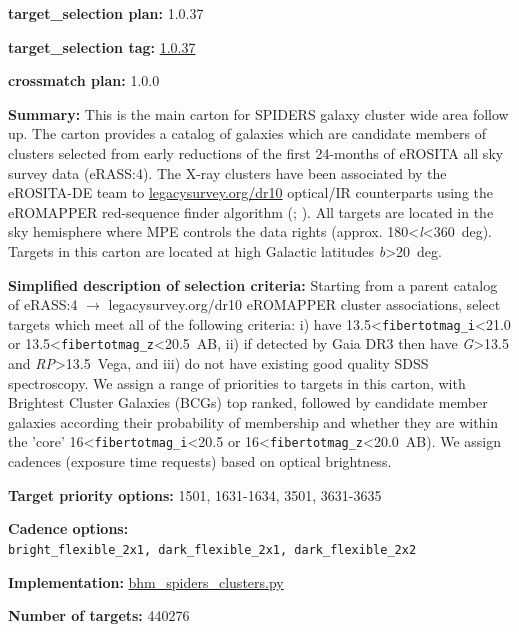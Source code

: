 \noindent\textbf{target\_selection plan:} 1.0.37

\noindent\textbf{target\_selection tag:}
\href{https://github.com/sdss/target_selection/tree/1.0.37/}{1.0.37}

\noindent\textbf{crossmatch plan:} 1.0.0

\noindent\textbf{Summary:} This is the main carton for SPIDERS galaxy cluster
wide area follow up. The carton provides a catalog of galaxies which are
candidate members of clusters selected from early reductions of the
first 24-months of eROSITA all sky survey data (eRASS:4). The X-ray
clusters have been associated by the eROSITA-DE team to
\href{https://www.legacysurvey.org/dr10/}{legacysurvey.org/dr10}
optical/IR counterparts using the eROMAPPER red-sequence finder
algorithm
(\citealt{Rykoff2014};
\citealt{IderChitham2020}). All targets are located in the sky hemisphere
where MPE controls the data rights (approx.
180\textless{}\emph{l}\textless360~deg). Targets in this carton are
located at high Galactic latitudes
\textbar{}\emph{b}\textbar\textgreater20~deg.

\noindent\textbf{Simplified description of selection criteria:} Starting from a
parent catalog of eRASS:4 $\rightarrow$ legacysurvey.org/dr10 eROMAPPER cluster
associations, select targets which meet all of the following criteria:
i) have 13.5\textless{}\texttt{fibertotmag\_i}\textless21.0 or
13.5\textless{}\texttt{fibertotmag\_z}\textless20.5~AB, ii) if detected
by Gaia DR3 then have \emph{G}\textgreater13.5 and
\emph{RP}\textgreater13.5~Vega, and iii) do not have existing good
quality SDSS spectroscopy. We assign a range of priorities to targets in
this carton, with Brightest Cluster Galaxies (BCGs) top ranked, followed
by candidate member galaxies according their probability of membership
and whether they are within the 'core'
16\textless{}\texttt{fibertotmag\_i}\textless20.5 or
16\textless{}\texttt{fibertotmag\_z}\textless20.0~AB). We assign
cadences (exposure time requests) based on optical brightness.


\noindent\textbf{Target priority options:} 1501, 1631-1634, 3501, 3631-3635

\noindent\textbf{Cadence options:}
\texttt{bright\_flexible\_2x1,\ dark\_flexible\_2x1,\ dark\_flexible\_2x2}

\noindent\textbf{Implementation:}
\href{https://github.com/sdss/target_selection/blob/1.0.37/python/target_selection/cartons/bhm_spiders_clusters.py}{bhm\_spiders\_clusters.py}

\noindent\textbf{Number of targets:} 440276


